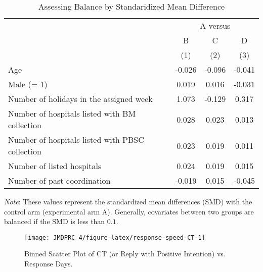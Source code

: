 \documentclass[12pt, a4paper]{article}
\begin{document}
\begin{table}[H]

\caption{\label{tab:smd-balance}Assessing Balance by Standaridized Mean Difference}
\centering
\fontsize{8}{10}\selectfont
\begin{threeparttable}
\begin{tabular}[t]{lccc}
\toprule
\multicolumn{1}{c}{ } & \multicolumn{3}{c}{A versus} \\
\cmidrule(l{3pt}r{3pt}){2-4}
\multicolumn{1}{c}{ } & \multicolumn{1}{c}{B} & \multicolumn{1}{c}{C} & \multicolumn{1}{c}{D} \\
\cmidrule(l{3pt}r{3pt}){2-2} \cmidrule(l{3pt}r{3pt}){3-3} \cmidrule(l{3pt}r{3pt}){4-4}
 & (1) & (2) & (3)\\
\midrule
Age & -0.026 & -0.096 & -0.041\\
Male (= 1) & 0.019 & 0.016 & -0.031\\
Number of holidays in the assigned week & 1.073 & -0.129 & 0.317\\
Number of hospitals listed with BM collection & 0.028 & 0.023 & 0.013\\
Number of hospitals listed with PBSC collection & 0.023 & 0.019 & 0.011\\
Number of listed hospitals & 0.024 & 0.019 & 0.015\\
Number of past coordination & -0.019 & 0.015 & -0.045\\
\bottomrule
\end{tabular}
\begin{tablenotes}
\item \emph{Note}: These values represent the standardized mean differences (SMD) with the control arm (experimental arm A). Generally, covariates between two groups are balanced if the SMD is less than $0.1$.
\end{tablenotes}
\end{threeparttable}
\end{table}

\begin{figure}[t]
\texttt{[image: JMDPRC~4/figure-latex/response-speed-CT-1]} \caption{Binned Scatter Plot of CT (or Reply with Positive Intention) vs. Response Days.}\label{fig:response-speed-CT}
\end{figure}
\end{document}
